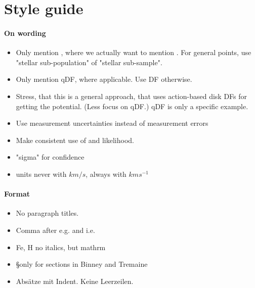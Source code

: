 \section{Style guide}

\paragraph{On wording}
\begin{itemize}
\item Only mention \MAP{}, where we actually want to mention \MAPs{}. For general points, use "stellar sub-population" of "stellar sub-sample".
\item Only mention qDF, where applicable. Use DF otherwise.
\item Stress, that this is a general approach, that uses action-based disk DFs for getting the potential. (Less focus on qDF.) qDF is only a specific example.
\item Use measurement uncertainties instead of measurement errors
\item Make consistent use of \pdf{} and likelihood.
\item "sigma" for confidence
\item units never with $km/s$, always with $km s^{-1}$
\end{itemize}

\paragraph{Format}
\begin{itemize}
\item No paragraph titles.
\item Comma after e.g. and i.e.
\item Fe, H no italics, but  mathrm
\item \S only for sections in Binney and Tremaine
\item Absätze mit Indent. Keine Leerzeilen.
\end{itemize}